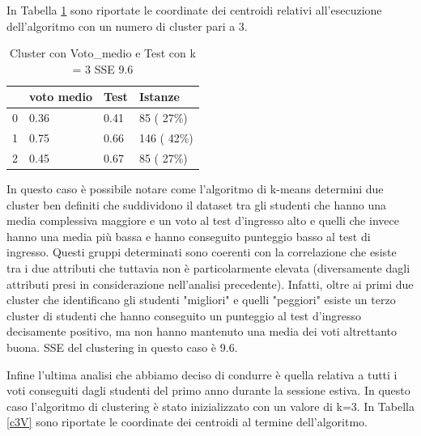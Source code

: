 \documentclass[12pt]{article}
\begin{document}
In Tabella \ref{c3MT} sono riportate le coordinate dei centroidi relativi all'esecuzione dell'algoritmo con un numero di cluster pari a 3.

\begin{table}[ht]
	\centering
	\begin{tabular}{@{}llll@{}}
	\toprule
	  & voto medio & Test  & Istanze\\ \midrule
	0 & 0.36       & 0.41  & 85  ( 27\%)\\
	1 & 0.75       & 0.66  & 146 ( 42\%)\\
	2 & 0.45       & 0.67  & 85  ( 27\%)\\ \bottomrule
	\end{tabular}
	\caption{Cluster con Voto\_medio e Test con k = 3 SSE 9.6}
	\label{c3MT}
\end{table}

In questo caso è possibile notare come
l'algoritmo di k-means determini due cluster ben definiti che suddividono il dataset tra gli studenti che hanno una
media complessiva maggiore e un voto al test d'ingresso alto e quelli che invece hanno una media più bassa e 
hanno conseguito punteggio basso al test di ingresso. Questi gruppi determinati sono coerenti con la correlazione 
che esiste tra i due attributi che tuttavia non è particolarmente elevata (diversamente dagli attributi presi in 
considerazione nell'analisi precedente). Infatti, oltre ai primi due cluster che identificano gli studenti "migliori"
e quelli "peggiori" esiste un terzo cluster di studenti che hanno conseguito un punteggio al test d'ingresso decisamente
positivo, ma non hanno mantenuto una media dei voti altrettanto buona. 
SSE del clustering in questo caso è 9.6.

Infine l'ultima analisi che abbiamo deciso di condurre è quella relativa a tutti i voti conseguiti dagli studenti del primo
anno durante la sessione estiva. In questo caso l'algoritmo di clustering è stato inizializzato con un valore di k=3.
In Tabella \ref{c3V} sono riportate le coordinate dei centroidi al termine dell'algoritmo. 

\end{document}
